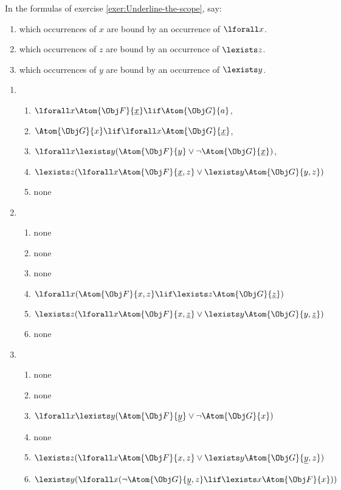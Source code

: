 \documentclass[../../../../include/open-logic-section]{subfiles}
\begin{document}
\begin{prob}[Binding]
In the formulas of exercise \ref{exer:Underline-the-scope},
say:
\begin{enumerate}
\item which occurrences of $x$ are bound by an occurrence of $\lforall x$. 
\item which occurrences of $z$ are bound by an occurrence of $\lexists z$. 
\item which occurrences of $y$ are bound by an occurrence of $\lexists y$. 
\end{enumerate}
\begin{ans}
\begin{enumerate}
	\item \begin{enumerate}
		\item $\lforall x\Atom{\Obj F}{\underline{x}}\lif \Atom{\Obj G}{a}$,
		\item $\Atom{\Obj G}{x}\lif\lforall x\Atom{\Obj G}{\underline{x}}$,
		\item $\lforall x\lexists y(\Atom{\Obj F}{y}\lor\lnot \Atom{\Obj G}{\underline{x}})$,
		\item $\lexists z(\lforall x\Atom{\Obj F}{\underline{x},z}\lor\lexists y\Atom{\Obj G}{y,z})$
		\item none
	\end{enumerate}
	\item \begin{enumerate}
		\item none
		\item none
		\item none
		\item $\lforall x(\Atom{\Obj F}{x,z}\lif\lexists z\Atom{\Obj G}{\underline{z}})$
		\item $\lexists z(\lforall x\Atom{\Obj F}{x,\underline{z}}\lor\lexists y\Atom{\Obj G}{y,\underline{z}})$
		\item none
	\end{enumerate}
	\item \begin{enumerate}
		\item none
		\item none
		\item $\lforall x\lexists y(\Atom{\Obj F}{\underline{y}}\lor\lnot \Atom{\Obj G}{x})$
		\item none
		\item $\lexists z(\lforall x\Atom{\Obj F}{x,z}\lor\lexists y\Atom{\Obj G}{\underline{y},z})$
		\item $\lexists y(\lforall x(\lnot \Atom{\Obj G}{\underline{y},z}\lif\lexists x\Atom{\Obj F}{x}))$
	\end{enumerate}

\end{enumerate}
\end{ans}
\end{prob}
\end{document}
